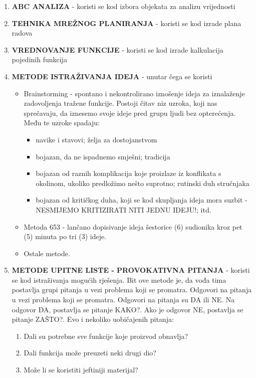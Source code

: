 \documentclass[a4paper,12pt]{article}
\numberwithin{figure}{section}
\begin{document}
\begin{enumerate}
\item \textbf{ABC ANALIZA} - koristi se kod izbora objekata za analizu vrijednosti
\item \textbf{TEHNIKA MREŽNOG PLANIRANJA} - koristi se kod izrade plana radova
\item \textbf{VREDNOVANJE FUNKCIJE} - koristi se kod izrade kalkulacija pojedinih funkcija
\item \textbf{METODE ISTRAŽIVANJA IDEJA} - unutar čega se koristi
\begin{itemize}
\item Brainstorming - spontano i nekontrolirano iznošenje ideja za iznalaženje zadovoljenja tražene funkcije. Postoji čitav niz uzroka, koji nas sprečavaju, da iznesemo svoje ideje pred grupu ljudi bez opterećenja. Među te uzroke spadaju:
\begin{itemize}
\item navike i stavovi; želja za dostojanstvom
\item bojazan, da ne ispadnemo smješni; tradicija
\item bojazan od raznih komplikacija koje proizlaze iz konflikata s okolinom, ukoliko predložimo nešto suprotno; rutinski duh stručnjaka
\item bojazan od kritičkog duha, koji se kod skupljanja ideja mora suzbit - NESMIJEMO KRITIZIRATI NITI JEDNU IDEJU!; itd.
\end{itemize}  
\item Metoda 653 - lančano dopisivanje ideja šestorice (6) sudionika kroz pet (5) minuta po tri (3) ideje.
\item Ostale metode. 
\end{itemize}
\item \textbf{METODE UPITNE LISTE - PROVOKATIVNA PITANJA} - koristi se kod istraživanja mogućih rješenja. Bit ove metode je, da vođa tima postavlja grupi pitanja u vezi problema koji se promatra. Odgovori na pitanja u vezi problema koji se promatra. Odgovori na pitanja su DA ili NE. Na odgovor DA, postavlja se pitanje KAKO?.  Ako je odgovor NE, postavlja se pitanje ZAŠTO?. Evo i nekoliko uobičajenih pitanja:
\begin{center}
\begin{enumerate}
\item Dali su potrebne sve funkcije koje proizvod obnavlja?
\item Dali funkcija može preuzeti neki drugi dio?
\item Može li se koristiti jeftiniji materijal?

\end{enumerate}
\end{center}
\end{enumerate}
\end{document}
